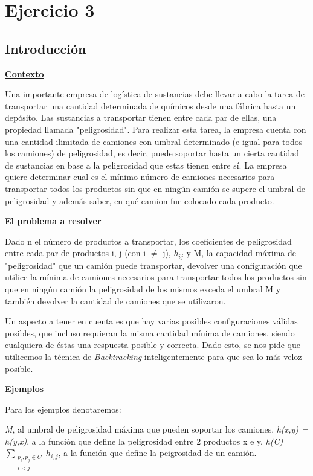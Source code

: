 \documentclass[10pt,a4paper]{article}
\begin{document}
\section{Ejercicio 3}

\subsection{Introducción}

\noindent \underline{\textbf{Contexto}}

Una importante empresa de logística de sustancias debe llevar a cabo la tarea de transportar una cantidad determinada de químicos desde una fábrica hasta un depósito. Las sustancias a transportar tienen entre cada par de ellas, una propiedad llamada "peligrosidad".
Para realizar esta tarea, la empresa cuenta con una cantidad ilimitada de camiones con umbral determinado (e igual para todos los camiones) de peligrosidad, es decir, puede soportar hasta un cierta cantidad de sustancias en base a la peligrosidad que estas tienen entre sí.
La empresa quiere determinar cual es el mínimo número de camiones necesarios para transportar todos los productos sin que en ningún camión se supere el umbral de peligrosidad y además saber, en qué camion fue colocado cada producto.

\noindent \underline{\textbf{El problema a resolver}}

Dado n el número de productos a transportar, los coeficientes de peligrosidad entre cada par de productos i, j (con i $\neq$ j), $h_{ij}$ y M, la capacidad máxima de "peligrosidad" que un camión puede transportar, devolver una configuración que utilice la mínima de camiones necesarios para transportar todos los productos sin que en ningún camión la peligrosidad de los mismos exceda el umbral M y también devolver la cantidad de camiones que se utilizaron.

Un aspecto a tener en cuenta es que hay varias posibles configuraciones válidas posibles, que incluso requieran la misma cantidad mínima de camiones, siendo cualquiera de éstas una respuesta posible y correcta. Dado esto, se nos pide que utilicemos la técnica de \textit{Backtracking} inteligentemente para que sea lo más veloz posible.

\noindent \underline{\textbf{Ejemplos}}

\noindent Para los ejemplos denotaremos:

\textit{M}, al umbral de peligrosidad máxima que pueden soportar los camiones.\newline
\indent \textit{h(x,y) = h(y,x)}, a la función que define la peligrosidad entre 2 productos x e y.\newline
\indent \textit{h(C) = $\sum_{\substack{p_i,p_j \in C \\ i < j}} h_{i,j}$}, a la función que define la peigrosidad de un camión.
\end{document}
